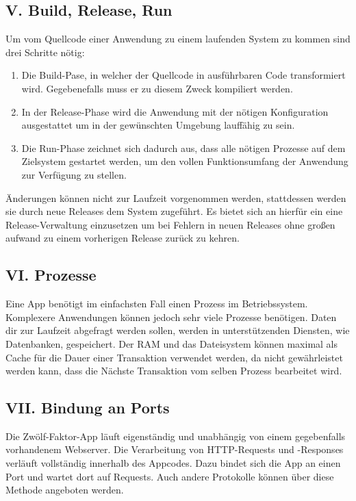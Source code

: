 \documentclass[fleqn,10pt]{SelfArx} %
\begin{document}
\subsection{V. Build, Release, Run}
Um vom Quellcode einer Anwendung zu einem laufenden System zu kommen sind drei Schritte nötig:
\begin{enumerate}
	\item Die Build-Pase, in welcher der Quellcode in ausführbaren Code transformiert wird. Gegebenefalls muss er zu diesem Zweck kompiliert werden.
	\item In der Release-Phase wird die Anwendung mit der nötigen Konfiguration ausgestattet um in der gewünschten Umgebung lauffähig zu sein.
	\item Die Run-Phase zeichnet sich dadurch aus, dass alle nötigen Prozesse auf dem Zielsystem gestartet werden, um den vollen Funktionsumfang der Anwendung zur Verfügung zu stellen.
\end{enumerate}
Änderungen können nicht zur Laufzeit vorgenommen werden, stattdessen werden sie durch neue Releases dem System zugeführt. Es bietet sich an hierfür ein eine Release-Verwaltung einzusetzen um bei Fehlern in neuen Releases ohne großen aufwand zu einem vorherigen Release zurück zu kehren.
\subsection{VI. Prozesse}
Eine App benötigt im einfachsten Fall einen Prozess im Betriebssystem. Komplexere Anwendungen können jedoch sehr viele Prozesse benötigen. Daten dir zur Laufzeit abgefragt werden sollen, werden in unterstützenden Diensten, wie Datenbanken, gespeichert. Der RAM und das Dateisystem können maximal als Cache für die Dauer einer Transaktion verwendet werden, da nicht gewährleistet werden kann, dass die Nächste Transaktion vom selben Prozess bearbeitet wird.


\subsection{VII. Bindung an Ports}
Die Zwölf-Faktor-App läuft eigenständig und unabhängig von einem gegebenfalls vorhandenem Webserver. Die Verarbeitung von HTTP-Requests und -Responses verläuft vollständig innerhalb des Appcodes. Dazu bindet sich die App an einen Port und wartet dort auf Requests. Auch andere Protokolle können über diese Methode angeboten werden.
\end{document}
